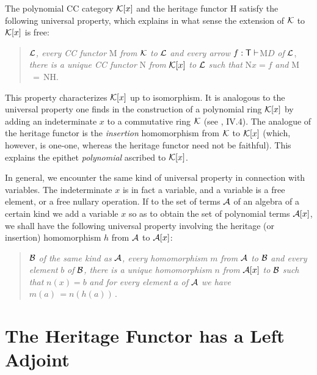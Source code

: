 \documentclass[12pt]{article}
\begin{document}
The polynomial CC category ${\cal K}[x]$ and the heritage functor H satisfy
the following universal property, which explains in what sense the extension
of ${\cal K}$ to ${\cal K}[x]$ is free:

\begin{quotation}
 ${\cal L}${\it , every CC functor} M 
{\it from} ${\cal K}$ {\it to} ${\cal L}$ {\it and every arrow} $f:{\sf T}%
\vdash $M$D$ {\it of} ${\cal L}$, {\it there is a unique CC functor} N {\it %
from} ${\cal K}[x]$ {\it to} ${\cal L}$ {\it such that} N$x=f$ {\it and} M$%
\,=\,$NH.
\end{quotation}

This property characterizes ${\cal K}[x]$ up to isomorphism. It is analogous
to the universal property one finds in the construction of a polynomial ring 
${\cal K}[x]$ by adding an indeterminate $x$ to a commutative ring ${\cal K}$
(see \cite{McLB79}, IV.4). The analogue of the heritage functor is the {\it %
insertion} homomorphism from ${\cal K}$ to ${\cal K}[x]$ (which, however, is
one-one, whereas the heritage functor need not be faithful). This explains
the epithet {\it polynomial} ascribed to ${\cal K}[x]$.

In general, we encounter the same kind of universal property in connection
with variables. The indeterminate $x$ is in fact a variable, and a variable
is a free element, or a free nullary operation. If to the set of terms $%
{\cal A}$ of an algebra of a certain kind we add a variable $x$ so as to
obtain the set of polynomial terms ${\cal A}[x]$, we shall have the
following universal property involving the heritage (or insertion)
homomorphism $h$ from ${\cal A}$ to ${\cal A}[x]$:

\begin{quotation}
 ${\cal B}$ {\it of the same kind as} $%
{\cal A}${\it , every homomorphism} $m$ {\it from} ${\cal A}$ {\it to} $%
{\cal B}$ {\it and every element} $b$ {\it of} ${\cal B}${\it , there is a
unique homomorphism} $n$ {\it from} ${\cal A}[x]$ {\it to} ${\cal B}$ {\it %
such that} $n(x)=b$ {\it and for every element} $a$ {\it of} ${\cal A}$ {\it %
we have} $m(a)\,=n(h(a))\,$.
\end{quotation}

\section{The Heritage Functor has a Left Adjoint}
\end{document}
